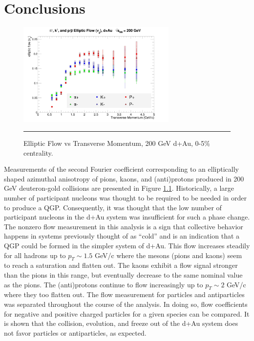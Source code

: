
\chapter{Conclusions} %

\begin{figure}[hbtp]

\centering
    \includegraphics[width=0.7\textwidth]{results/v2all.jpg}
    \rule{35em}{0.5pt}
    \caption[Elliptic Flow vs Transverse Momentum, 200 GeV d+Au, 0-5\% centrality]{Elliptic Flow vs Transverse Momentum, 200 GeV d+Au, 0-5\% centrality.}
    \label{fig:v2main}
\end{figure}

Measurements of the second Fourier coefficient corresponding to an elliptically shaped azimuthal anisotropy of pions, kaons, and (anti)protons produced in 200 GeV deuteron-gold collisions are presented in Figure \ref{fig:v2main}. Historically, a large number of participant nucleons was thought to be required to be needed in order to produce a QGP. Consequently, it was thought that the low number of participant nucleons in the d+Au system was insufficient for such a phase change. The nonzero flow measurement in this analysis is a sign that collective behavior happens in systems previously thought of as ``cold'' and is an indication that a QGP could be formed in the simpler system of d+Au. This flow increases steadily for all hadrons up to $p_T \sim 1.5 $ GeV/c where the mesons (pions and kaons) seem to reach a saturation and flatten out. The kaons exhibit a flow signal stronger than the pions in this range, but eventually decrease to the same nominal value as the pions. The (anti)protons continue to flow increasingly up to $p_T \sim 2$ GeV/c where they too flatten out. The flow measurement for particles and antiparticles was separated throughout the course of the analysis. In doing so, flow coefficients for negative and positive charged particles for a given species can be compared. It is shown that the collision, evolution, and freeze out of the d+Au system does not favor particles or antiparticles, as expected.

